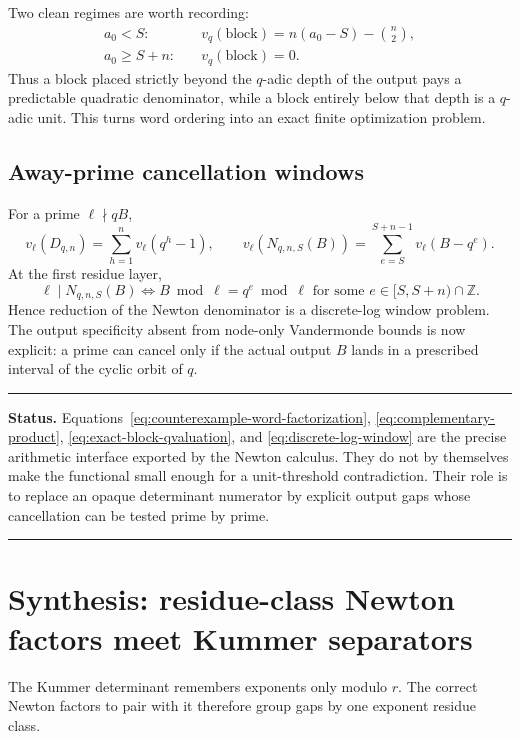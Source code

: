 \documentclass[11pt,oneside]{article}
\theoremstyle{definition}
\theoremstyle{remark}
\newcommand{\Z}{\mathbb Z}
\newenvironment{statusbox}[1]
{\begin{center}\begin{minipage}{0.94\textwidth}\hrule\vspace{0.45em}\textbf{Status.} #1\par\vspace{0.35em}}
{\vspace{0.35em}\hrule\end{minipage}\end{center}}
\begin{document}
Two clean regimes are worth recording:
\begin{align*}
 a_0<S:
 &\quad v_q(\text{block})=n(a_0-S)-\binom n2,\\
 a_0\ge S+n:
 &\quad v_q(\text{block})=0.
\end{align*}
Thus a block placed strictly beyond the $q$-adic depth of the output pays a predictable
quadratic denominator, while a block entirely below that depth is a $q$-adic unit.  This
turns word ordering into an exact finite optimization problem.

\subsection{Away-prime cancellation windows}

For a prime $\ell\nmid qB$,
\begin{equation}
 v_\ell(D_{q,n})=\sum_{h=1}^n v_\ell(q^h-1),
 \qquad
 v_\ell(N_{q,n,S}(B))
 =\sum_{e=S}^{S+n-1}v_\ell(B-q^e).
 \label{eq:away-valuations}
\end{equation}
At the first residue layer,
\begin{equation}
 \ell\mid N_{q,n,S}(B)
 \iff
 B\bmod\ell=q^e\bmod\ell
 \text{ for some }e\in[S,S+n)\cap\Z.
 \label{eq:discrete-log-window}
\end{equation}
Hence reduction of the Newton denominator is a discrete-log window problem.  The output
specificity absent from node-only Vandermonde bounds is now explicit: a prime can cancel only
if the actual output $B$ lands in a prescribed interval of the cyclic orbit of $q$.

\begin{statusbox}{Equations~\eqref{eq:counterexample-word-factorization},
\eqref{eq:complementary-product}, \eqref{eq:exact-block-qvaluation}, and
\eqref{eq:discrete-log-window} are the precise arithmetic interface exported by the Newton
calculus.  They do not by themselves make the functional small enough for a unit-threshold
contradiction.  Their role is to replace an opaque determinant numerator by explicit output
gaps whose cancellation can be tested prime by prime.}
\end{statusbox}

\section{Synthesis: residue-class Newton factors meet Kummer separators}
\label{sec:synthesis}

The Kummer determinant remembers exponents only modulo $r$.  The correct Newton factors to
pair with it therefore group gaps by one exponent residue class.
\end{document}
